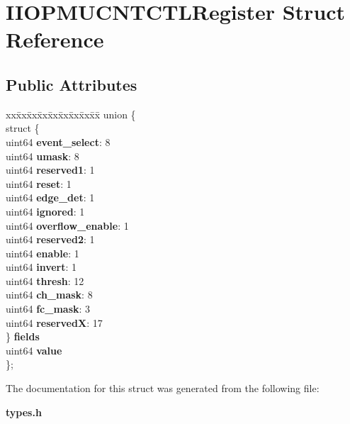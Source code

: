 \section{I\+I\+O\+P\+M\+U\+C\+N\+T\+C\+T\+L\+Register Struct Reference}
\label{structIIOPMUCNTCTLRegister}
\subsection*{Public Attributes}
\begin{DoxyCompactItemize}
\item 
\mbox{\label{structIIOPMUCNTCTLRegister_ab5f54a63669cf375c1fa606375a51cfe}} 
\begin{tabbing}
xx\=xx\=xx\=xx\=xx\=xx\=xx\=xx\=xx\=\kill
union \{\\
\>struct \{\\
\>\>uint64 {\bfseries event\_select}: 8\\
\>\>uint64 {\bfseries umask}: 8\\
\>\>uint64 {\bfseries reserved1}: 1\\
\>\>uint64 {\bfseries reset}: 1\\
\>\>uint64 {\bfseries edge\_det}: 1\\
\>\>uint64 {\bfseries ignored}: 1\\
\>\>uint64 {\bfseries overflow\_enable}: 1\\
\>\>uint64 {\bfseries reserved2}: 1\\
\>\>uint64 {\bfseries enable}: 1\\
\>\>uint64 {\bfseries invert}: 1\\
\>\>uint64 {\bfseries thresh}: 12\\
\>\>uint64 {\bfseries ch\_mask}: 8\\
\>\>uint64 {\bfseries fc\_mask}: 3\\
\>\>uint64 {\bfseries reservedX}: 17\\
\>\} {\bfseries fields}\\
\>uint64 {\bfseries value}\\
\}; \\

\end{tabbing}\end{DoxyCompactItemize}


The documentation for this struct was generated from the following file\+:\begin{DoxyCompactItemize}
\item 
\textbf{ types.\+h}\end{DoxyCompactItemize}

